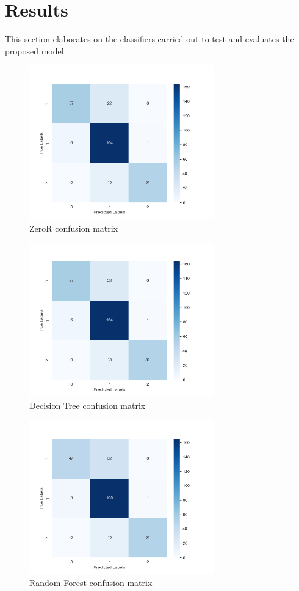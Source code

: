 \documentclass[conference]{IEEEtran}
\begin{document}
\section{Results}
This section elaborates on the classifiers carried out to test and evaluates the proposed model.

\begin{figure}[H]
    \centering
    \includegraphics[width=8cm]{fig6.png}
    \caption{ZeroR confusion matrix}
    \label{fig:6}
\end{figure}

\begin{figure}[H]
    \centering
    \includegraphics[width=8cm]{fig7.png}
    \caption{Decision Tree confusion matrix}
    \label{fig:7}
\end{figure}

\begin{figure}[H]
    \centering
    \includegraphics[width=8cm]{fig8.png}
    \caption{Random Forest confusion matrix}
    \label{fig:8}
\end{figure}
\end{document}
